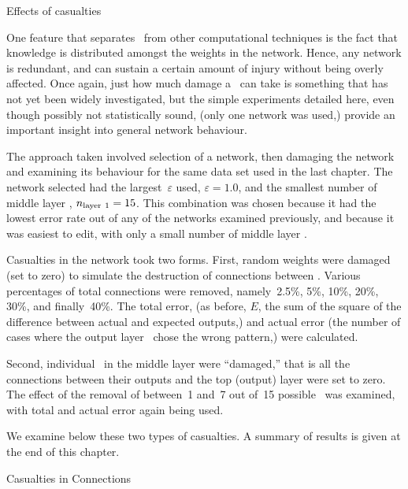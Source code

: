 \chap Effects of casualties

One feature that separates \nns\ from other computational 
techniques is the fact that knowledge is distributed amongst the
weights in the network.
Hence, any network is redundant, and can sustain a certain amount of
injury without being overly affected.
Once again, just how much damage a \nn\ can take is something that
has not yet been widely investigated, but the simple experiments
detailed here, even though possibly not statistically sound, (only
one network was used,) provide an important insight into general
network behaviour.

The approach taken involved selection of a network, then damaging
the network and examining its behaviour for the same data set used
in the last chapter.
The network selected had the largest~$\varepsilon$ used,
$\varepsilon = 1.0$, and the smallest number of middle layer \neus,
$n_{\rm layer\ 1} = 15$.
This combination was chosen because it had the lowest error rate out
of any of the networks examined previously, and because it was
easiest to edit, with only a small number of middle layer \neus.

Casualties in the network took two forms.
First, random weights were damaged (set to zero) to
simulate the destruction of connections between \neus.
Various percentages of total connections were removed, namely~2.5\%,
5\%, 10\%, 20\%, 30\%, and finally~40\%.
The total error, (as before, $E$, the sum of the square of the
difference between actual and expected outputs,) and actual error
(the number of cases where the output layer \neus\ chose the wrong
pattern,) were calculated.

Second, individual \neus\ in the middle layer were ``damaged,'' that
is all the connections between their outputs and the top (output)
layer were set to zero.
The effect of the removal of between~1 and~7 out of~15 possible
\neus\ was examined, with total and actual error again being used.

We examine below these two types of casualties.
A summary of results is given at the end of this chapter.

\sec Casualties in Connections

